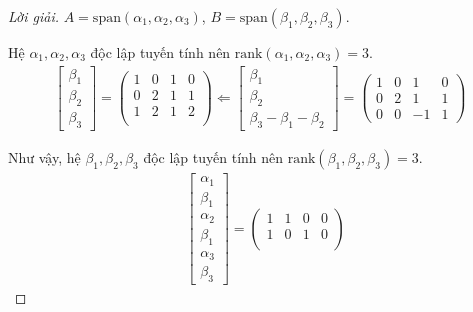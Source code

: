\documentclass[class=linearalgebra,crop=false]{standalone}
\begin{document}
\begin{proof}[Lời giải]$A = \text{span}(\alpha_{1},\alpha_{2},\alpha_{3})$, $B = \text{span}(\beta_{1},\beta_{2},\beta_{3})$.
    \par Hệ $\alpha_{1}, \alpha_{2}, \alpha_{3}$ độc lập tuyến tính nên $\text{rank}(\alpha_{1}, \alpha_{2}, \alpha_{3}) = 3$.
    \begin{align*}
        \begin{bmatrix}
            \beta_{1} \\
            \beta_{2} \\
            \beta_{3}
        \end{bmatrix}=
        \begin{pmatrix}
            1 & 0 & 1 & 0 \\
            0 & 2 & 1 & 1 \\
            1 & 2 & 1 & 2 \\
        \end{pmatrix}
        \Longleftarrow
        \begin{bmatrix}
            \beta_{1} \\
            \beta_{2} \\
            \beta_{3} - \beta_{1} - \beta_{2}
        \end{bmatrix}=
        \begin{pmatrix}
            1 & 0 & 1  & 0 \\
            0 & 2 & 1  & 1 \\
            0 & 0 & -1 & 1
        \end{pmatrix}
    \end{align*}
    \par Như vậy, hệ $\beta_{1}, \beta_{2}, \beta_{3}$ độc lập tuyến tính nên $\text{rank}(\beta_{1}, \beta_{2}, \beta_{3}) = 3$.
    \begin{align*}
                        & \begin{bmatrix}
            \alpha_{1} \\
            \beta_{1}  \\
            \alpha_{2} \\
            \beta_{1}  \\
            \alpha_{3} \\
            \beta_{3}
        \end{bmatrix}=
        \begin{pmatrix}
            1 & 1 & 0 & 0 \\
            1 & 0 & 1 & 0 \\

\end{pmatrix}
\end{align*}
\end{proof}
\end{document}
